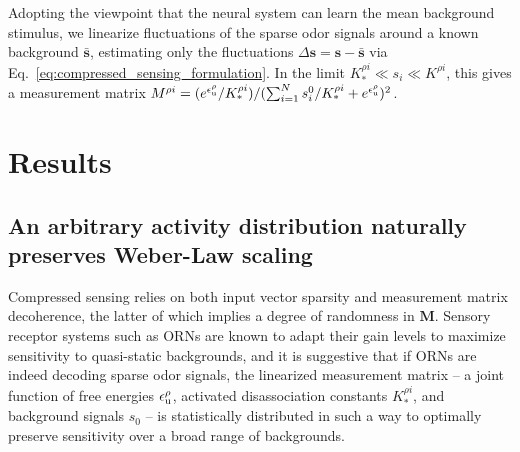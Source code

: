 \documentclass[9pt,twocolumn,twoside]{pnas-new}
\begin{document}
Adopting the viewpoint that the neural system can learn the mean background stimulus, we linearize fluctuations of the sparse odor signals around a known background $\bar{\mathbf s}$, estimating only the fluctuations $\Delta \mathbf s = \mathbf s - \bar{\mathbf s}$ via Eq.~\ref{eq:compressed_sensing_formulation}. In the limit $K_*^{\rho i} \ll s_i \ll K^{\rho i}$, this gives a measurement matrix $M^{\rho i} = (e^{\epsilon^\rho_{\text u}}/K_*^{\rho i})/(\sum_{i=1}^N s_i^0/K_*^{\rho i} + e^{\epsilon^\rho_{\text u}})^2$. 

\section*{Results}

\subsection*{An arbitrary activity distribution naturally preserves Weber-Law scaling} 


Compressed sensing relies on both input vector sparsity and measurement matrix decoherence, the latter of which implies a degree of randomness in $\mathbf M$. Sensory receptor systems such as ORNs are known to adapt their gain levels to maximize sensitivity to quasi-static backgrounds, and it is suggestive that if ORNs are indeed decoding sparse odor signals, the linearized measurement matrix -- a joint function of free energies $\epsilon_{\text u}^\rho$, activated disassociation constants $K_*^{\rho i}$, and background signals $s_0$ -- is statistically distributed in such a way to optimally preserve sensitivity over a broad range of backgrounds. 
\end{document}
